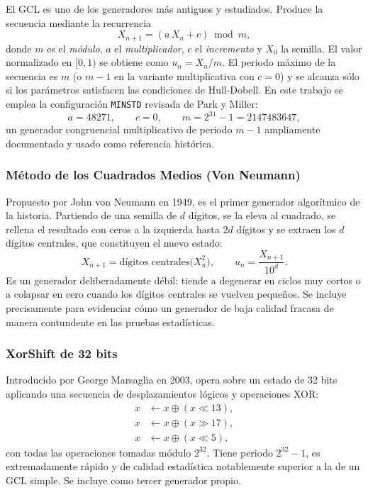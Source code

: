 \documentclass[11pt]{article}
\begin{document}
El GCL es uno de los generadores m\'as antiguos y estudiados. Produce la
secuencia mediante la recurrencia
\begin{equation}
X_{n+1} = (a\,X_n + c) \bmod m,
\end{equation}
donde $m$ es el \emph{m\'odulo}, $a$ el \emph{multiplicador}, $c$ el
\emph{incremento} y $X_0$ la semilla. El valor normalizado en $[0,1)$ se
obtiene como $u_n = X_n / m$. El periodo m\'aximo de la secuencia es $m$
(o $m-1$ en la variante multiplicativa con $c=0$) y se alcanza s\'olo si
los par\'ametros satisfacen las condiciones de Hull-Dobell. En este
trabajo se emplea la configuraci\'on \texttt{MINSTD} revisada de Park y
Miller:
\begin{equation}
a = 48271, \qquad c = 0, \qquad m = 2^{31} - 1 = 2147483647,
\end{equation}
un generador congruencial multiplicativo de periodo $m-1$ ampliamente
documentado y usado como referencia hist\'orica.

\subsubsection{M\'etodo de los Cuadrados Medios (Von Neumann)}

Propuesto por John von Neumann en 1949, es el primer generador
algor\'itmico de la historia. Partiendo de una semilla de $d$ d\'igitos,
se la eleva al cuadrado, se rellena el resultado con ceros a la izquierda
hasta $2d$ d\'igitos y se extraen los $d$ d\'igitos centrales, que
constituyen el nuevo estado:
\begin{equation}
X_{n+1} = \text{d\'igitos centrales}\big(X_n^2\big), \qquad
u_n = \frac{X_{n+1}}{10^{d}}.
\end{equation}
Es un generador deliberadamente d\'ebil: tiende a degenerar en ciclos
muy cortos o a colapsar en cero cuando los d\'igitos centrales se vuelven
peque\~nos. Se incluye precisamente para evidenciar c\'omo un generador de
baja calidad fracasa de manera contundente en las pruebas estad\'isticas.

\subsubsection{XorShift de 32 bits}

Introducido por George Marsaglia en 2003, opera sobre un estado de 32
bits aplicando una secuencia de desplazamientos l\'ogicos y operaciones
XOR:
\begin{align}
x &\leftarrow x \oplus (x \ll 13), \\
x &\leftarrow x \oplus (x \gg 17), \\
x &\leftarrow x \oplus (x \ll 5),
\end{align}
con todas las operaciones tomadas m\'odulo $2^{32}$. Tiene periodo
$2^{32}-1$, es extremadamente r\'apido y de calidad estad\'istica
notablemente superior a la de un GCL simple. Se incluye como tercer
generador propio.
\end{document}
